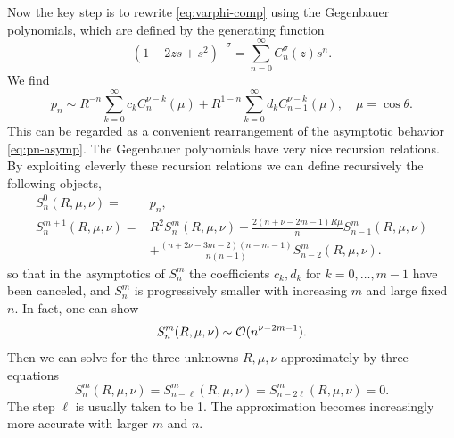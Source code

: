 \documentclass[a4paper,11pt]{article}
\theoremstyle{definition}
\newcommand{\CO}{{\cal O}}
\newcommand{\nn}{\nonumber \\}
\begin{document}
Now the key step is to rewrite \eqref{eq:varphi-comp} using the Gegenbauer
polynomials, which are defined by the generating function
%
\begin{equation}
  (1-2zs + s^2)^{-\sigma} = \sum_{n=0}^\infty C_n^\sigma(z) s^n.
\end{equation}
We find
\begin{equation}
  p_n \sim R^{-n} \sum_{k=0}^\infty c_k C_n^{\nu-k}(\mu)
  + R^{1-n} \sum_{k=0}^\infty d_k C_{n-1}^{\nu-k}(\mu) ,\quad \mu
  =\cos\theta.
  \label{eq:pn-asymp2}
\end{equation}
This can be regarded as a convenient rearrangement of the asymptotic
behavior \eqref{eq:pn-asymp}.  The Gegenbauer polynomials have very
nice recursion relations.  By exploiting cleverly these recursion relations
we can define recursively the following objects, 
\begin{align}
  S_n^0(R,\mu,\nu) =
  &p_n,
    \label{eq:Sn0}\\
  S_n^{m+1}(R,\mu,\nu) =
  &R^2 S_{n}^m(R,\mu,\nu) - \frac{2(n+\nu-2m-1)
    R \mu}{n} S_{n-1}^m(R,\mu,\nu) \nn
  &+ \frac{(n+2\nu-3m-2)(n-m-1)}{n(n-1)}S_{n-2}^{m}(R,\mu,\nu).
    \label{eq:Snm}
\end{align}
so that in the asymptotics of $S_n^{m}$ the coefficients $c_k,d_k$ for
$k=0,\ldots,m-1$ have been canceled, and $S_n^{m}$ is progressively
smaller with increasing $m$ and large fixed $n$.  In fact, one can
show
\begin{equation}
  S_n^m(R,\mu,\nu) \sim \CO(n^{\nu-2m-1}).
\end{equation}
Then we can solve for the three unknowns $R,\mu,\nu$ approximately by
three equations
\begin{equation}
  S_{n}^{m}(R,\mu,\nu) = S_{n-\ell}^{m}(R,\mu,\nu) =
  S_{n-2\ell}^{m}(R,\mu,\nu) = 0.
  \label{eq:S3-eqs}
\end{equation}
The step $\ell$ is usually taken to be 1.  The approximation becomes
increasingly more accurate with larger $m$ and $n$.
\end{document}
